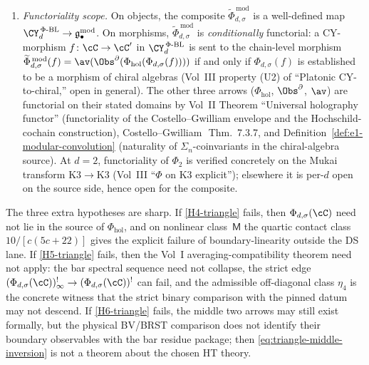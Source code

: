 \begin{theorem}
\begin{enumerate}[label=\textup{(\roman*)}]
 In the K3 theorem case and in the two calibration checks, the kernel
 $\ker(\av)|_{r}$ vanishes at degree~$n=2$ on the corresponding
 composite; the genuine
 averaging-non-trivial information first appears at degree
 $n \geq 3$ in the higher shadow $S_3, S_4, \dots$ of the image
 algebra.
\item \emph{Functoriality scope.} On objects, the composite
 $\widetilde\Phi_{d,\sigma}^{\,\mathrm{mod}}$ is a well-defined map
 $\CY_d^{\,\Phi\text{-BL}} \to \mathfrak{g}^{\mathrm{mod}}_\bullet$.
 On morphisms, $\widetilde\Phi_{d,\sigma}^{\,\mathrm{mod}}$ is
 \emph{conditionally} functorial: a CY-morphism
 $f \colon \cC \to \cC'$ in $\CY_d^{\,\Phi\text{-BL}}$ is sent to
 the chain-level morphism
 $\widetilde\Phi_{d,\sigma}^{\,\mathrm{mod}}(f) =
 \av(\Obs^\partial(\Phi_{\mathrm{hol}}(\Phi_{d,\sigma}(f))))$
 if and only if $\Phi_{d,\sigma}(f)$ is established to be a morphism of
 chiral algebras \textup{(}Vol~III property \textup{(U2)} of
 ``Platonic CY-to-chiral,'' open in general\textup{).} The other
 three arrows ($\Phi_{\mathrm{hol}}$, $\Obs^\partial$, $\av$) are
 functorial on their stated domains by Vol~II Theorem ``Universal
 holography functor'' \textup{(}functoriality of the
 Costello--Gwilliam envelope and the Hochschild-cochain
 construction\textup{)}, Costello--Gwilliam~\cite{CG21}\,Thm.~7.3.7,
 and Definition~\textup{\ref{def:e1-modular-convolution}}
 \textup{(}naturality of $\Sigma_n$-coinvariants in the chiral-algebra
 source\textup{).} At $d = 2$, functoriality of $\Phi_2$ is verified
 concretely on the Mukai transform $\mathrm{K3} \to \mathrm{K3}$
 \textup{(}Vol~III ``$\Phi$ on K3 explicit''\textup{);}
 elsewhere it is per-$d$ open on the source side, hence open for
 the composite.
\end{enumerate}
The three extra hypotheses are sharp. If
\textup{\ref{H4-triangle}} fails, then $\Phi_{d,\sigma}(\cC)$ need not lie in
the source of $\Phi_{\mathrm{hol}}$, and on nonlinear class~$\mathsf{M}$
the quartic contact class $10/[c(5c+22)]$ gives the explicit failure of
boundary-linearity outside the DS lane. If \textup{\ref{H5-triangle}}
fails, then the Vol~I averaging-compatibility theorem need not apply:
the bar spectral sequence need not collapse, the strict edge
$(\Phi_{d,\sigma}(\cC))^{!}_\infty\to (\Phi_{d,\sigma}(\cC))^!$ can fail, and the admissible
off-diagonal class $\eta_4$ is the concrete witness that the strict
binary comparison with the pinned datum may not descend.
If \textup{\ref{H6-triangle}} fails, the middle two arrows may still
exist formally, but the physical BV/BRST comparison does not identify
their boundary observables with the bar residue package; then
\eqref{eq:triangle-middle-inversion} is not a theorem about the
chosen HT theory.
\end{theorem}

